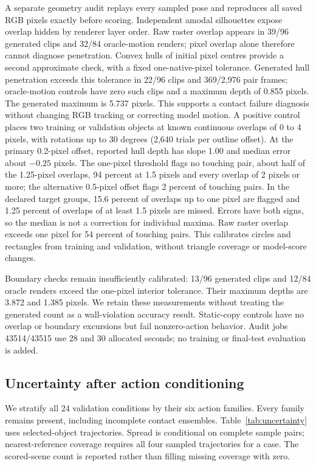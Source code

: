 \documentclass[11pt,a4paper]{article}
\begin{document}
A separate geometry audit replays every sampled pose and reproduces all saved RGB pixels exactly before scoring. Independent amodal silhouettes expose overlap hidden by renderer layer order. Raw raster overlap appears in 39/96 generated clips and 32/84 oracle-motion renders; pixel overlap alone therefore cannot diagnose penetration. Convex hulls of initial pixel centres provide a second approximate check, with a fixed one-native-pixel tolerance. Generated hull penetration exceeds this tolerance in 22/96 clips and 369/2,976 pair frames; oracle-motion controls have zero such clips and a maximum depth of 0.855 pixels. The generated maximum is 5.737 pixels. This supports a contact failure diagnosis without changing RGB tracking or correcting model motion.
A positive control places two training or validation objects at known continuous overlaps of 0 to 4 pixels, with rotations up to 30 degrees (2,640 trials per outline offset). At the primary 0.2-pixel offset, reported hull depth has slope 1.00 and median error about $-0.25$ pixels. The one-pixel threshold flags no touching pair, about half of the 1.25-pixel overlaps, 94 percent at 1.5 pixels and every overlap of 2 pixels or more; the alternative 0.5-pixel offset flags 2 percent of touching pairs. In the declared target groups, 15.6 percent of overlaps up to one pixel are flagged and 1.25 percent of overlaps of at least 1.5 pixels are missed. Errors have both signs, so the median is not a correction for individual maxima. Raw raster overlap exceeds one pixel for 54 percent of touching pairs. This calibrates circles and rectangles from training and validation, without triangle coverage or model-score changes.

Boundary checks remain insufficiently calibrated: 13/96 generated clips and 12/84 oracle renders exceed the one-pixel interior tolerance. Their maximum depths are 3.872 and 1.385 pixels. We retain these measurements without treating the generated count as a wall-violation accuracy result. Static-copy controls have no overlap or boundary excursions but fail nonzero-action behavior. Audit jobs 43514/43515 use 28 and 30 allocated seconds; no training or final-test evaluation is added.

\clearpage
\subsection{Uncertainty after action conditioning}
We stratify all 24 validation conditions by their six action families. Every family remains present, including incomplete contact ensembles. Table~\ref{tab:uncertainty} uses selected-object trajectories. Spread is conditional on complete sample pairs; nearest-reference coverage requires all four sampled trajectories for a case. The scored-scene count is reported rather than filling missing coverage with zero.
\end{document}
